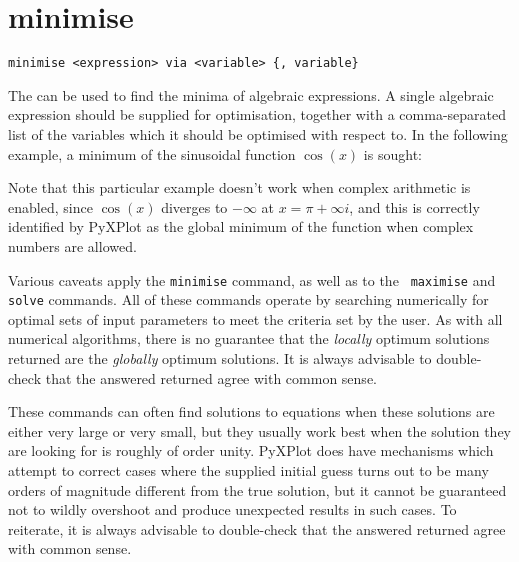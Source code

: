 \section{minimise}

\begin{verbatim}
minimise <expression> via <variable> {, variable}
\end{verbatim}

The  can be used to find the minima of algebraic expressions.
A single algebraic expression should be supplied for optimisation, together
with a comma-separated list of the variables which it should be optimised with
respect to. In the following example, a minimum of the sinusoidal function
$\cos(x)$ is sought:

\vspace{3mm}
\newline
{}\newline
{}\newline
{}\newline
{}
\vspace{3mm}

\noindent Note that this particular example doesn't work when complex
arithmetic is enabled, since $\cos(x)$ diverges to $-\infty$ at $x=\pi+\infty
i$, and this is correctly identified by PyXPlot as the global minimum of the
function when complex numbers are allowed.

Various caveats apply the {\tt minimise} command, as well as to the {\tt
maximise} and {\tt solve} commands.  All of these commands operate by searching
numerically for optimal sets of input parameters to meet the criteria set by
the user. As with all numerical algorithms, there is no guarantee that the {\it
locally} optimum solutions returned are the {\it globally} optimum solutions.
It is always advisable to double-check that the answered returned agree with
common sense.

These commands can often find solutions to equations when these solutions are
either very large or very small, but they usually work best when the solution
they are looking for is roughly of order unity.  PyXPlot does have mechanisms
which attempt to correct cases where the supplied initial guess turns out to be
many orders of magnitude different from the true solution, but it cannot be
guaranteed not to wildly overshoot and produce unexpected results in such
cases.  To reiterate, it is always advisable to double-check that the answered
returned agree with common sense.


